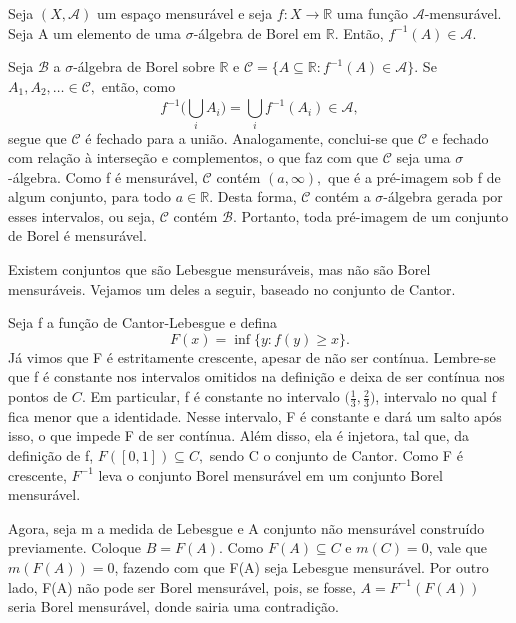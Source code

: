 \documentclass[MeasureTheory/measure_theory.tex]{subfiles}
\begin{document}
\begin{prop*}
	Seja \((X, \mathcal{A})\) um espaço mensurável e seja \(f:X\rightarrow \mathbb{R}\) uma função \(\mathcal{A}\)-mensurável. Seja A um elemento de uma \(\sigma \)-álgebra de Borel em \(\mathbb{R}.\) Então, \(f^{-1}(A)\in \mathcal{A}.\)
\end{prop*}
\begin{proof*}
	Seja \(\mathcal{B}\) a \(\sigma \)-álgebra de Borel sobre \(\mathbb{R}\) e \(\mathcal{C} = \{A\subseteq \mathbb{R}: f^{-1}(A)\in \mathcal{A}\}.\) Se \(A_{1}, A_2,\dotsc \in \mathcal{C},\) então, como
	\[
		f^{-1}\biggl(\bigcup_{i}^{}A_{i}\biggr) = \bigcup_{i}^{}f^{-1}(A_{i})\in \mathcal{A},
	\]
	segue que \(\mathcal{C}\) é fechado para a união. Analogamente, conclui-se que \(\mathcal{C}\) e fechado com relação à interseção e complementos, o que faz com que \(\mathcal{C}\) seja uma \(\sigma \)-álgebra.
	Como f é mensurável, \(\mathcal{C}\) contém \((a, \infty),\) que é a pré-imagem sob f de algum conjunto, para todo \(a\in \mathbb{R}.\) Desta forma, \(\mathcal{C}\) contém a \(\sigma \)-álgebra gerada por esses intervalos,
	ou seja, \(\mathcal{C}\) contém \(\mathcal{B}\). Portanto, toda pré-imagem de um conjunto de Borel é mensurável. \qedsymbol
\end{proof*}
Existem conjuntos que são Lebesgue mensuráveis, mas não são Borel mensuráveis. Vejamos um deles a seguir, baseado no conjunto de Cantor.
\begin{example}
	Seja f a função de Cantor-Lebesgue e defina
	\[
		F(x) = \inf_{}\{y: f(y)\geq x\}.
	\]
	Já vimos que F é estritamente crescente, apesar de não ser contínua. Lembre-se que f é constante nos intervalos omitidos na definição e deixa de ser contínua nos pontos de \(C\). Em particular, f é constante no intervalo
	\(\biggl(\frac{1}{3}, \frac{2}{3}\biggr)\), intervalo no qual f fica menor que a identidade. Nesse intervalo, F é constante e dará um salto após isso, o que impede F de ser contínua. Além disso, ela é injetora, tal que, da definição de f, \(F([0, 1])\subseteq C,\) sendo C
	o conjunto de Cantor. Como F é crescente, \(F^{-1}\) leva o conjunto Borel mensurável em um conjunto Borel mensurável.

	Agora, seja m a medida de Lebesgue e A conjunto não mensurável construído previamente. Coloque \(B = F(A)\). Como \(F(A)\subseteq C\) e \(m(C) = 0\),
	vale que \(m(F(A)) = 0\), fazendo com que F(A) seja Lebesgue mensurável. Por outro lado, F(A) não pode ser Borel mensurável, pois, se fosse, \(A = F^{-1}(F(A))\) seria Borel mensurável, donde sairia uma contradição.
\end{example}
\end{document}
